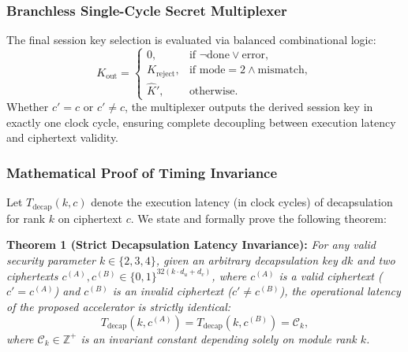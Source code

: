 \subsubsection{Branchless Single-Cycle Secret Multiplexer}
The final session key selection is evaluated via balanced combinational logic:
\begin{equation}
\label{eq:branchless_hw}
K_{\text{out}} = \begin{cases}
0, & \text{if } \neg \text{done} \lor \text{error}, \\
K_{\text{reject}}, & \text{if } \text{mode} = 2 \land \text{mismatch}, \\
\hat{K}', & \text{otherwise}.
\end{cases}
\end{equation}
Whether $c' = c$ or $c' \neq c$, the multiplexer outputs the derived session key in exactly one clock cycle, ensuring complete decoupling between execution latency and ciphertext validity.

\subsubsection{Mathematical Proof of Timing Invariance}
Let $T_{\text{decap}}(k, c)$ denote the execution latency (in clock cycles) of decapsulation for rank $k$ on ciphertext $c$. We state and formally prove the following theorem:

\vspace{0.2cm}
\noindent\textbf{Theorem 1 (Strict Decapsulation Latency Invariance):}  
\textit{For any valid security parameter $k \in \{2, 3, 4\}$, given an arbitrary decapsulation key $dk$ and two ciphertexts $c^{(A)}, c^{(B)} \in \{0, 1\}^{32(k \cdot d_u + d_v)}$, where $c^{(A)}$ is a valid ciphertext ($c' = c^{(A)}$) and $c^{(B)}$ is an invalid ciphertext ($c' \neq c^{(B)}$), the operational latency of the proposed accelerator is strictly identical:}
\begin{equation}
\label{eq:theorem_invariance}
T_{\text{decap}}(k, c^{(A)}) = T_{\text{decap}}(k, c^{(B)}) = \mathcal{C}_k,
\end{equation}
\textit{where $\mathcal{C}_k \in \mathbb{Z}^+$ is an invariant constant depending solely on module rank $k$.}

